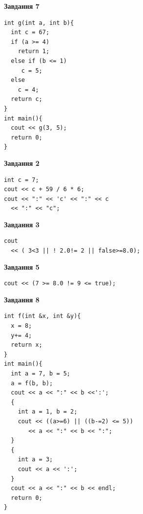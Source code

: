 \documentclass[12pt, ukrainian]{article}
\begin{document}
{\begin {large}
\begin{minipage}[t]{7.0cm}
\begin{center}
\textbf{Завдання 7}
\end{center}
\vspace{-8mm}

\begin{verbatim}
int g(int a, int b){
  int c = 67;
  if (a >= 4)
    return 1;
  else if (b <= 1)
     c = 5;
  else
    c = 4;
  return c;
}
int main(){
  cout << g(3, 5);
  return 0;
}
\end{verbatim}

\end{minipage}
\vline \hspace{1mm}
\begin{minipage}[t]{11.0cm}

\begin{center}
\textbf{Завдання 2}
\end{center}
\vspace{-8mm}

\begin{verbatim}
int c = 7;
cout << c + 59 / 6 * 6;
cout << ":" << 'c' << ":" << c 
  << ":" << "c";
\end{verbatim}



\begin{center}
\textbf{Завдання 3}
\end{center}
\vspace{-8mm}

\begin{verbatim}
cout 
  << ( 3<3 || ! 2.0!= 2 || false>=8.0);
\end{verbatim}



\begin{center}
\textbf{Завдання 5}
\end{center}
\vspace{-8mm}

\begin{verbatim}
cout << (7 >= 8.0 != 9 <= true);
\end{verbatim}



\begin{center}
\textbf{Завдання 8}
\end{center}
\vspace{-8mm}

\begin{verbatim}
int f(int &x, int &y){
  x = 8;
  y+= 4;
  return x;
}
int main(){
  int a = 7, b = 5;
  a = f(b, b);
  cout << a << ":" << b <<':';
  {
    int a = 1, b = 2;
    cout << ((a>=6) || ((b-=2) <= 5))
       << a << ":" << b << ":";
  }
  {
    int a = 3;
    cout << a << ':';
  }
  cout << a << ":" << b << endl;
  return 0;
}
\end{verbatim}


\end{minipage}
\end{large}}
\end{document}
